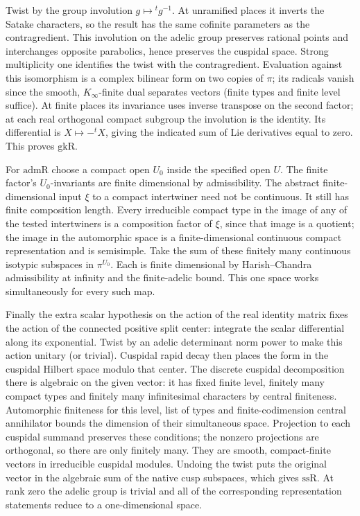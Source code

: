 Twist by the group involution $g\mapsto{}^tg^{-1}$. At unramified
places it inverts the Satake characters, so the result has the same
cofinite parameters as the contragredient. This involution on the
adelic group preserves rational points and interchanges opposite
parabolics, hence preserves the cuspidal space. Strong multiplicity
one identifies the twist with the contragredient. Evaluation against
this isomorphism is a complex bilinear form on two copies of $\pi$;
its radicals vanish since the smooth, $K_\infty$-finite dual
separates vectors (finite types and finite level suffice). At finite
places its invariance uses inverse transpose on the second factor;
at each real orthogonal compact subgroup the involution is the
identity. Its differential is $X\mapsto-{}^tX$, giving the indicated
sum of Lie derivatives equal to zero. This proves $\mathrm{gkR}$.

For $\mathrm{admR}$ choose a compact open $U_0$ inside the specified
open $U$. The finite factor's $U_0$-invariants are finite dimensional
by admissibility. The abstract finite-dimensional input $\xi$ to a
compact intertwiner need not be continuous. It still has finite
composition length. Every irreducible compact type in the image of
any of the tested intertwiners is a composition factor of $\xi$,
since that image is a quotient; the image in the automorphic space
is a finite-dimensional continuous compact representation and is
semisimple. Take the sum of these finitely many continuous isotypic
subspaces in $\pi^{U_0}$. Each is finite dimensional by
Harish--Chandra admissibility at infinity and the finite-adelic bound.
This one space works simultaneously for every such map.

Finally the extra scalar hypothesis on the action of the real identity
matrix fixes the action of the connected positive split center:
integrate the scalar differential along its exponential. Twist by an
adelic determinant norm power to make this action unitary (or trivial).
Cuspidal rapid decay then places the form in the cuspidal Hilbert space
modulo that center. The discrete cuspidal decomposition there is
algebraic on the given vector: it has fixed finite level, finitely
many compact types and finitely many infinitesimal characters by
central finiteness. Automorphic finiteness for this level, list of
types and finite-codimension central annihilator bounds the dimension
of their simultaneous space. Projection to each cuspidal summand
preserves these conditions; the nonzero projections are orthogonal,
so there are only finitely many. They are smooth, compact-finite
vectors in irreducible cuspidal modules. Undoing the twist puts the
original vector in the algebraic sum of the native cusp subspaces,
which gives $\mathrm{ssR}$. At rank zero the adelic group is trivial
and all of the corresponding representation statements reduce to a
one-dimensional space.

